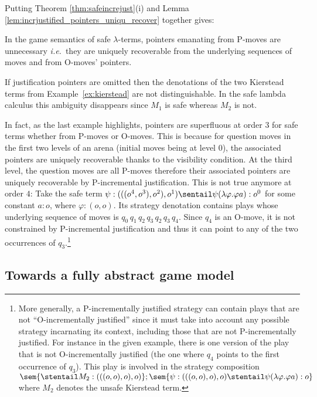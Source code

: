 Putting Theorem \ref{thm:safeincrejust}(i) and Lemma
\ref{lem:incrjustified_pointers_uniqu_recover} together gives:
\begin{proposition}
  \label{prop:safe_ptr_recoverable} In the game semantics of safe
  $\lambda$-terms, pointers emanating from P-moves are unnecessary
  {\it i.e.}~they are uniquely recoverable from the underlying sequences of
  moves and from O-moves' pointers.
\end{proposition}

 \begin{example} If justification pointers are omitted then the denotations of the
   two Kierstead terms from Example~\ref{ex:kierstead} are not distinguishable.
   In the safe lambda calculus this ambiguity disappears
   since $M_1$ is safe whereas $M_2$ is not.
 \end{example}

In fact, as the last example highlights, pointers are superfluous at
order $3$ for safe terms whether from P-moves or O-moves. This is
because for question moves in the first two levels of an arena
(initial moves being at level $0$), the associated pointers are
uniquely recoverable thanks to the visibility condition. At the
third level, the question moves are all P-moves therefore their
associated pointers are uniquely recoverable by P-incremental
justification. This is not true anymore at order $4$: Take the safe
term $\psi:(((o^4,o^3),o^2),o^1) \sentail \psi (\lambda \varphi .
\varphi a) : o^0$ for some constant $a:o$, where $\varphi:(o,o)$.
Its strategy denotation contains plays whose underlying sequence of
moves is $q_0 \, q_1 \, q_2 \, q_3 \, q_2 \, q_3 \, q_4$. Since
$q_4$ is an O-move, it is not constrained by P-incremental
justification and thus it can point to any of the two occurrences of
$q_3$.\footnote{More generally, a P-incrementally justified strategy
can contain plays that are not ``O-incrementally justified'' since
it must take into account any possible strategy incarnating its
context, including those that are not P-incrementally justified. For
instance in the given example, there is one version of the play that
is not O-incrementally justified (the one where $q_4$ points to the
first occurrence of $q_3$). This play is involved in the strategy
composition $\sem{ \stentail M_2 : (((o,o),o),o)} ; \sem{
\psi:(((o,o),o),o) \stentail \psi (\lambda \varphi . \varphi a):o}$
where $M_2$ denotes the unsafe Kierstead term.}


\subsection*{Towards a fully abstract game model}\hfill

